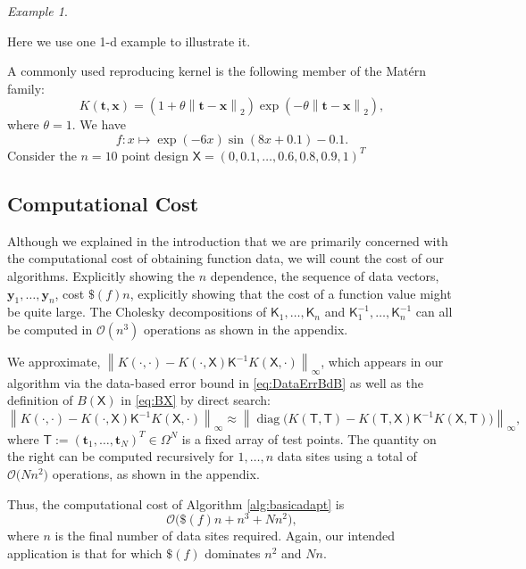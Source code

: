 \documentclass[]{mcom-l}
\theoremstyle{remark}
\newtheorem{example}{Example}
\DeclareMathOperator{\diag}{diag}
\newcommand{\mK}{\mathsf{K}}
\newcommand{\mT}{\mathsf{T}}
\newcommand{\mX}{\mathsf{X}}
\newcommand{\bx}{{\boldsymbol{x}}}
\newcommand{\by}{{\boldsymbol{y}}}
\newcommand{\bt}{{\boldsymbol{t}}}
\newcommand{\cx}{{\Omega}}
\newcommand{\norm}[2][{}]{\ensuremath{\left \lVert #2 \right \rVert}_{#1}}
\newcommand{\Order}{\mathcal{O}}
\begin{document}
\begin{example}
	
	
	
\end{example}


Here we use one 1-d example to illustrate it.

 A commonly used reproducing kernel is the following member of the Mat\'ern family:
\[
K(\bt,\bx) = (1 + \theta \norm[2]{\bt-\bx}) \exp(-\theta\norm[2]{\bt-\bx}),
\]
where $\theta = 1.$
We have \[f: x \mapsto \exp(-6x) \sin(8x+0.1) - 0.1.\]
Consider the $n=10$ point design $\mX = (0, 0.1, \ldots, 0.6, 0.8, 0.9, 1)^T$

\subsection{Computational Cost} \label{sec:compCost}
Although we explained in the introduction that we are primarily concerned with the computational cost of obtaining function data, we will count the cost of our algorithms.  Explicitly showing the $n$ dependence, the sequence of data vectors, $\by_1, \ldots, \by_n$, cost $\$(f)n$, explicitly showing that the cost of a function value might be quite large.  The Cholesky decompositions of $\mK_1, \ldots, \mK_n$ and $\mK_1^{-1}, \ldots, \mK_n^{-1}$ can all be computed in $\Order(n^3)$ operations as shown in the appendix.  

We approximate, $\norm[\infty]{K(\cdot,\cdot) - K(\cdot,\mX) \mK^{-1} K(\mX,\cdot)}$, which appears in our algorithm via the data-based error bound in \eqref{eq:DataErrBdB} as well as the definition of $B(\mX)$ in \eqref{eq:BX} by direct search:
\begin{equation} \label{eq:normappx}
\norm[\infty]{K(\cdot,\cdot) - K(\cdot,\mX) \mK^{-1} K(\mX,\cdot)} \approx \norm[\infty]{\diag\bigl(K(\mT,\mT) - K(\mT,\mX) \mK^{-1} K(\mX,\mT) \bigr)},
\end{equation}
where $\mT := (\bt_1, \ldots, \bt_N)^T \in \cx^N$ is a fixed array of test points.  The quantity on the right can be computed recursively for $1, \ldots, n$ data sites using a total of $\Order\bigl( Nn^2 \bigr)$ operations, as shown in the appendix.  

Thus, the computational cost of Algorithm \ref{alg:basicadapt} is
\begin{equation}
\Order\bigl(\$(f)n + n^3 + Nn^2 \bigr),
\end{equation}
where $n$ is the final number of data sites required.  Again, our intended application is that for which $\$(f)$ dominates $n^2$ and $Nn$.  
\end{document}
